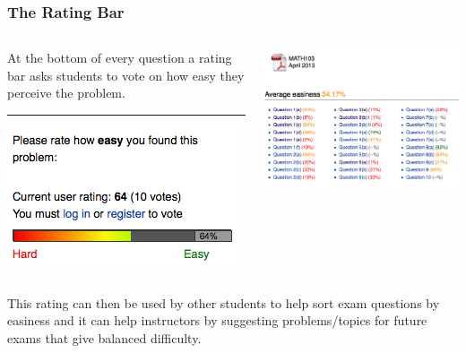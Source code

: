 \documentclass{beamer}
\begin{document}
\frame
{\frametitle{\bf{The Rating Bar}}
\begin{columns}
\begin{column}{0.4\textwidth}
At the bottom of every question a rating bar asks students to vote on how easy they perceive the problem.
\medskip
\hrule
\smallskip
\includegraphics[width=\textwidth]{ratingBar.png}
\end{column}
\begin{column}{0.6\textwidth}
\includegraphics[width=\textwidth]{M103_exampage.png}
\end{column}
\end{columns}
\smallskip
This rating can then be used by other students to help sort exam questions by easiness and it can help instructors by suggesting problems/topics for future exams that give balanced difficulty.
}
\end{document}

